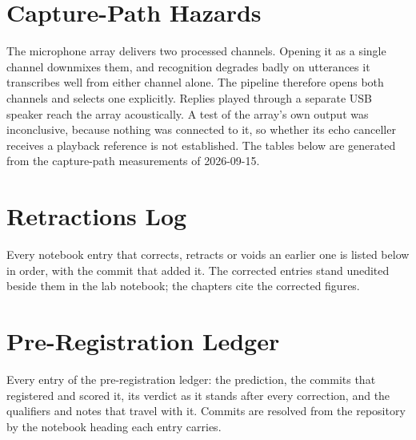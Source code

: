 \appendix

\chapter{Capture-Path Hazards}
\label{app:capture}

The microphone array delivers two processed channels. Opening it as a single
channel downmixes them, and recognition degrades badly on utterances it
transcribes well from either channel alone. The pipeline therefore opens
both channels and selects one explicitly. Replies played through a separate
USB speaker reach the array acoustically. A test of the array's own output
was inconclusive, because nothing was connected to it, so whether its echo
canceller receives a playback reference is not established. The tables below
are generated from the capture-path measurements of 2026-09-15.



\chapter{Retractions Log}
\label{app:retractions}

Every notebook entry that corrects, retracts or voids an earlier one is
listed below in order, with the commit that added it. The corrected entries
stand unedited beside them in the lab notebook; the chapters cite the
corrected figures.



\chapter{Pre-Registration Ledger}
\label{app:prereg}

Every entry of the pre-registration ledger: the prediction, the commits that
registered and scored it, its verdict as it stands after every correction,
and the qualifiers and notes that travel with it. Commits are resolved from
the repository by the notebook heading each entry carries.


